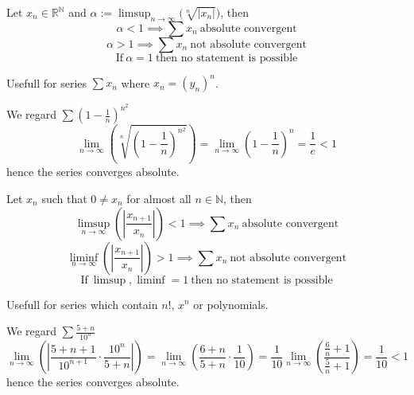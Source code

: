 \begin{proposition}\label{pro:root_test}
   Let \(x_n \in \mathbb{R}^\mathbb{N}\) and \(\alpha := \limsup_{n \to \infty}\big(\sqrt[n]{|x_n|}\big)\), then
   \[\alpha < 1 \implies \sum x_n~\text{absolute convergent}\]
   \[\alpha > 1 \implies \sum x_n~\text{not absolute convergent}\]
   \[\text{If}~\alpha = 1~\text{then no statement is possible}\]
\end{proposition}
\begin{remark}[Tips]
   Usefull for series \(\sum x_n\) where \(x_n = (y_n)^n\).
\end{remark}
\begin{example}
   We regard \(\sum \left(1 - \frac{1}{n}\right)^{n^2}\)
   \[\lim_{n \to \infty}\left(\sqrt[n]{\left(1 - \frac{1}{n}\right)^{n^2}}\right) = \lim_{n \to \infty} \left(1 - \frac{1}{n}\right)^n = \frac{1}{e} < 1\]
   hence the series converges absolute.
\end{example}

\begin{proposition}\label{pro:ratio_test}
   Let \(x_n\) such that \(0 \neq x_n\) for almost all \(n \in \mathbb{N}\), then
   \[\limsup_{n \to \infty} \left(\left|\frac{x_{n+1}}{x_n}\right|\right) < 1 \implies \sum x_n~\text{absolute convergent}\]
   \[\liminf_{n \to \infty} \left(\left|\frac{x_{n+1}}{x_n}\right|\right) > 1 \implies \sum x_n~\text{not absolute convergent}\]
   \[\text{If}~\limsup, \liminf = 1~\text{then no statement is possible}\]
\end{proposition}
\begin{remark}[Tips]
   Usefull for series which contain \(n!\), \(x^n\) or polynomials.
\end{remark}
\begin{example}
   We regard \(\sum \frac{5 + n}{10^n}\)
   \[\lim_{n \to \infty}\left(\left\lvert\frac{5 + n + 1}{10^{n+1}} \cdot \frac{10^n}{5 + n}\right\rvert\right) = \lim_{n \to \infty}\left(\frac{6+n}{5+n} \cdot \frac{1}{10}\right) = \frac{1}{10} \lim_{n \to \infty}\left(\frac{\frac{6}{n} + 1}{\frac{5}{n}+1}\right) = \frac{1}{10} < 1\]
   hence the series converges absolute.
\end{example}

